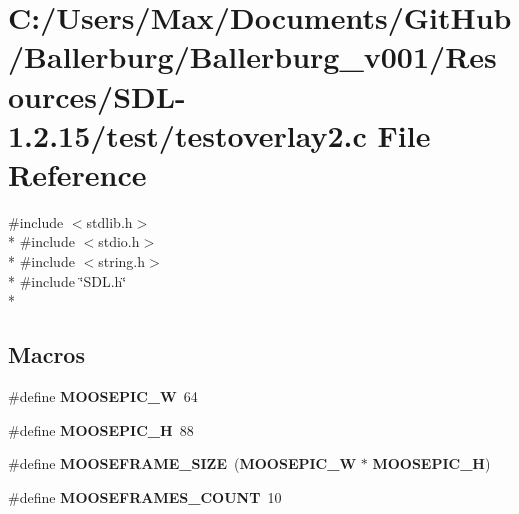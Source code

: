\section{C\+:/\+Users/\+Max/\+Documents/\+Git\+Hub/\+Ballerburg/\+Ballerburg\+\_\+v001/\+Resources/\+S\+D\+L-\/1.2.15/test/testoverlay2.c File Reference}
\label{testoverlay2_8c}
{\ttfamily \#include $<$stdlib.\+h$>$}\\*
{\ttfamily \#include $<$stdio.\+h$>$}\\*
{\ttfamily \#include $<$string.\+h$>$}\\*
{\ttfamily \#include \char`\"{}S\+D\+L.\+h\char`\"{}}\\*
\subsection*{Macros}
\begin{DoxyCompactItemize}
\item 
\#define {\bf M\+O\+O\+S\+E\+P\+I\+C\+\_\+\+W}~64
\item 
\#define {\bf M\+O\+O\+S\+E\+P\+I\+C\+\_\+\+H}~88
\item 
\#define {\bf M\+O\+O\+S\+E\+F\+R\+A\+M\+E\+\_\+\+S\+I\+Z\+E}~({\bf M\+O\+O\+S\+E\+P\+I\+C\+\_\+\+W} $\ast$ {\bf M\+O\+O\+S\+E\+P\+I\+C\+\_\+\+H})
\item 
\#define {\bf M\+O\+O\+S\+E\+F\+R\+A\+M\+E\+S\+\_\+\+C\+O\+U\+N\+T}~10
\end{DoxyCompactItemize}
